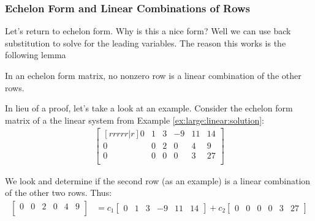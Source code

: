 \subsubsection{Echelon Form and Linear Combinations of Rows}

Let's return to echelon form.  Why is this a nice form?  Well we can use back substitution to solve for the leading variables.  The reason this works is the following lemma

\begin{lemma}In an echelon form matrix, no nonzero row is a linear combination of the other rows.   \label{lem:ech:ind}
\end{lemma}


In lieu of a proof, let's take a look at an example.  Consider  the echelon form matrix of a the linear system from Example \ref{ex:large:linear:solution}:
%
\begin{align*}
\begin{bmatrix}[rrrrr|r]
0 & 1 & 3 & -9 & 11 & 14 \\
0 & 0 & 2 & 0 & 4 & 9 \\
0 & 0 & 0 & 0 & 3 & 27 \\
\end{bmatrix}
\end{align*}

We look and determine if the second row (as an example) is a linear combination of the other two rows.  Thus:
%
\begin{align*}
\begin{bmatrix}
0 & 0 & 2 & 0 & 4 & 9 \\
\end{bmatrix} & = c_1 \begin{bmatrix}
0 & 1 & 3 & -9 & 11 & 14 
\end{bmatrix} + c_2 \begin{bmatrix}
0 & 0 & 0 & 0 & 3 & 27 
\end{bmatrix}
\end{align*}

